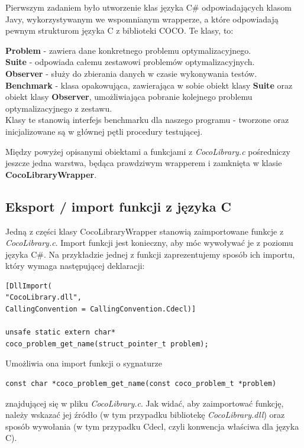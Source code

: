 \documentclass[12pt, twoside, openany, abstract=on]{report}
\theoremstyle{definition}
\begin{document}
Pierwszym zadaniem było utworzenie klas języka C\# odpowiadających klasom Javy, wykorzystywanym we wspomnianym wrapperze, a które odpowiadają pewnym strukturom języka C z biblioteki COCO. Te klasy, to:

\textbf{Problem} - zawiera dane konkretnego problemu optymalizacyjnego.\\
\textbf{Suite} - odpowiada całemu zestawowi problemów optymalizacyjnych.\\
\textbf{Observer} - służy do zbierania danych w czasie wykonywania testów.\\
\textbf{Benchmark} - klasa opakowująca, zawierająca w sobie obiekt klasy \textbf{Suite} oraz obiekt klasy \textbf{Observer}, umożliwiająca pobranie kolejnego problemu optymalizacyjnego z zestawu.\\

Klasy te stanowią interfejs benchmarku dla naszego programu - tworzone oraz inicjalizowane są w głównej pętli procedury testującej.

Między powyżej opisanymi obiektami a funkcjami z \textit{CocoLibrary.c} pośredniczy jeszcze jedna warstwa, będąca prawdziwym wrapperem i zamknięta w klasie \textbf{CocoLibraryWrapper}.

\subsection{Eksport / import funkcji z języka C}

Jedną z części klasy CocoLibraryWrapper stanowią zaimportowane funkcje z \textit{CocoLibrary.c}. Import funkcji jest konieczny, aby móc wywoływać je z poziomu języka C\#. Na przykładzie jednej z funkcji zaprezentujemy sposób ich importu, który wymaga następującej deklaracji:\\

\begin{lstlisting}[frame=single]
[DllImport(
"CocoLibrary.dll", 
CallingConvention = CallingConvention.Cdecl)]

unsafe static extern char* 
coco_problem_get_name(struct_pointer_t problem);
\end{lstlisting}

Umożliwia ona import funkcji o sygnaturze

\begin{lstlisting}[frame=single]
const char *coco_problem_get_name(const coco_problem_t *problem)
\end{lstlisting}

znajdującej się w pliku \textit{CocoLibrary.c}. Jak widać, aby zaimportować funkcję, należy wskazać jej źródło (w tym przypadku bibliotekę \textit{CocoLibrary.dll}) oraz sposób wywołania (w tym przypadku Cdecl, czyli konwencja właściwa dla języka C). 
\end{document}
